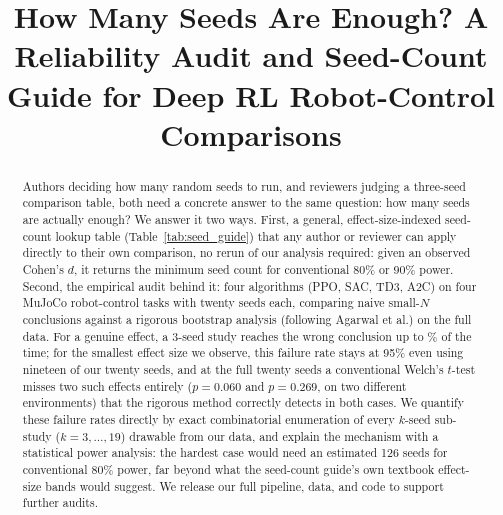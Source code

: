 \documentclass[journal]{IEEEtran}
\begin{document}
\title{How Many Seeds Are Enough? A Reliability Audit and Seed-Count Guide for Deep RL Robot-Control Comparisons}

\author{
}


\maketitle

\begin{abstract}
Authors deciding how many random seeds to run, and reviewers judging a three-seed comparison
table, both need a concrete answer to the same question: how many seeds are actually enough? We
answer it two ways. First, a general, effect-size-indexed seed-count lookup table
(Table~\ref{tab:seed_guide}) that any author or reviewer can apply directly to their own
comparison, no rerun of our analysis required: given an observed Cohen's $d$, it returns the
minimum seed count for conventional 80\% or 90\% power. Second, the empirical audit behind it:
four algorithms (PPO, SAC, TD3, A2C) on four MuJoCo robot-control tasks with twenty seeds each,
comparing naive small-$N$ conclusions against a rigorous bootstrap analysis (following Agarwal et
al.) on the full data. For a genuine effect, a 3-seed study reaches the wrong conclusion up to
\% of the time; for the smallest effect size we observe,
this failure rate stays at 95\% even using nineteen of our twenty seeds, and at the full twenty
seeds a conventional Welch's $t$-test misses two such effects entirely ($p=0.060$ and $p=0.269$,
on two different environments) that the rigorous method correctly detects in both cases. We
quantify these failure rates directly by exact combinatorial enumeration of every $k$-seed
sub-study ($k=3,\ldots,19$) drawable from our data, and explain the mechanism with a statistical
power analysis: the hardest case would need an estimated 126 seeds for conventional 80\% power,
far beyond what the seed-count guide's own textbook effect-size bands would suggest. We release
our full pipeline, data, and code to support further audits.
\end{abstract}
\end{document}
